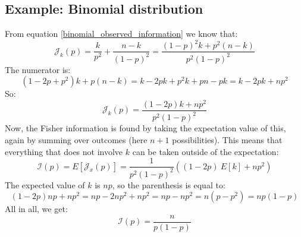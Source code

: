 \documentclass[12pt, a4paper]{article}
\numberwithin{equation}{section}
\begin{document}
\subsection{Example: Binomial distribution}
From equation \ref{binomial_observed_information} we know that:
\begin{equation}
\mathcal{J}_k(p)=\frac{k}{p^2}+\frac{n-k}{(1-p)^2}=\frac{(1-p)^2 k+p^2(n-k)}{p^2(1-p)^2}
\end{equation}
The numerator is:
\begin{equation}
(1-2p+p^2)k+p(n-k)=k-2pk+p^2 k+pn-pk=k-2pk+np^2
\end{equation}
So:
\begin{equation}
\mathcal{J}_k(p)=\frac{(1-2p)k+np^2}{p^2(1-p)^2}
\end{equation}
Now, the Fisher information is found by taking the expectation value of this, again by summing over outcomes (here $n+1$ possibilities). This means that everything that does not involve $k$ can be taken outside of the expectation:
\begin{equation}
\mathcal{I}(p)=E[\mathcal{J}_x(p)]=\frac{1}{p^2(1-p)^2}((1-2p)\ E[k]+np^2)
\end{equation}
The expected value of $k$ is $np$, so the parenthesis is equal to:
\begin{equation}
(1-2p)np+np^2=np-2np^2+np^2=np-np^2=n(p-p^2)=np(1-p)
\end{equation}
All in all, we get:
\begin{equation}
\mathcal{I}(p)=\frac{n}{p(1-p)}
\end{equation}
\end{document}
